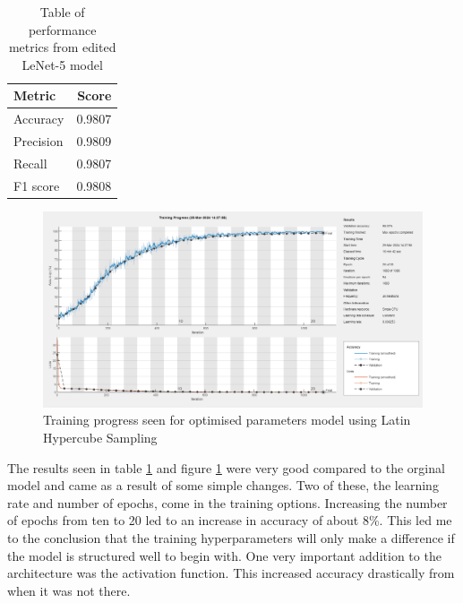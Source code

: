 \documentclass[11pt, letterpaper]{article}
\begin{document}
\begin{table}[ht]
  \begin{center}
    \caption{Table of performance metrics from edited LeNet-5 model}
    \label{tab:OwnCNNPerformanceMetrics}
    \begin{tabular}{l|r} %
      \textbf{Metric} & \textbf{Score}\\
      \hline
      Accuracy & 0.9807\\
      Precision & 0.9809\\
      Recall & 0.9807\\
      F1 score & 0.9808\\
    \end{tabular}
  \end{center}
\end{table}

\begin{figure}[ht]
    \centering
    \includegraphics[width=1\linewidth]{Lab 5/OwnCNNTrainingProcess.png}
    \caption{Training progress seen for optimised parameters model using Latin Hypercube Sampling}
    \label{fig:OwnCNNTrainingProcess}
\end{figure}

The results seen in table \ref{tab:OwnCNNPerformanceMetrics} and figure \ref{fig:OwnCNNTrainingProcess} were very good compared to the orginal model and came as a result of some simple changes. Two of these, the learning rate and number of epochs, come in the training options. Increasing the number of epochs from ten to 20 led to an increase in accuracy of about 8\%. This led me to the conclusion that the training hyperparameters will only make a difference if the model is structured well to begin with. One very important addition to the architecture was the activation function. This increased accuracy drastically from when it was not there.
\end{document}
